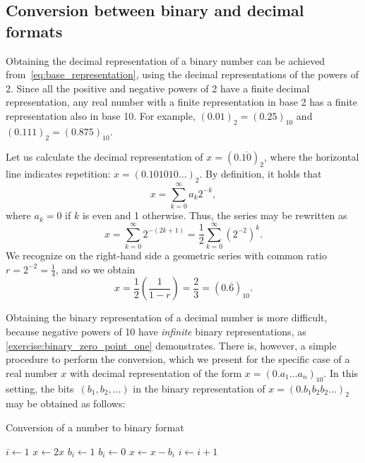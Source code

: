 \subsection{Conversion between binary and decimal formats}%
Obtaining the decimal representation of a binary number can be achieved from~\eqref{eq:base_representation},
using the decimal representations of the powers of 2.
Since all the positive and negative powers of 2 have a finite decimal representation,
any real number with a finite representation in base 2 has a finite representation also in base 10.
For example, $(0.01)_2 = (0.25)_{10}$ and $(0.111)_2 = (0.875)_{10}$.
\begin{example}
    \label{example:converting_binary_to_decimal}
    Let us calculate the decimal representation of $x = (0.\overline{10})_2$,
    where the horizontal line indicates repetition: $x = (0.101010\dots)_2$.
    By definition, it holds that
    \[
        x = \sum_{k=0}^{\infty} a_k 2^{-k},
    \]
    where $a_k = 0$ if $k$ is even and 1 otherwise.
    Thus, the series may be rewritten as
    \[
        x = \sum_{k=0}^{\infty} 2^{-(2k+1)} = \frac{1}{2} \sum_{k=0}^{\infty} (2^{-2})^k.
    \]
    We recognize on the right-hand side a geometric series with common ratio $r = 2^{-2} = \frac{1}{4}$,
    and so we obtain
    \[
        x = \frac{1}{2} \left( \frac{1}{1-r} \right) = \frac{2}{3} = (0.\overline 6)_{10}.
    \]
\end{example}

Obtaining the binary representation of a decimal number is more difficult,
because negative powers of 10 have \emph{infinite} binary representations,
as \cref{exercise:binary_zero_point_one} demonstrates.
There is, however, a simple procedure to perform the conversion,
which we present for the specific case of a real number $x$ with decimal representation of the form $x = (0.a_1\dots a_n)_{10}$.
In this setting,
the bits~$(b_1, b_2, \dots)$ in the binary representation of $x = (0.b_1b_2b_2 \dots)_2$ may be obtained as follows:
\begin{algorithm}
\caption{Conversion of a number to binary format}%
\label{algo:conversion_to_binary}%
\begin{algorithmic}[1]
\State $i \gets 1$
    \State $x \gets 2x$%
    \label{line:after_while}
        \State $b_i \gets 1$
    \Else
        \State $b_i \gets 0$
    \EndIf
    \State $x \gets x - b_i$
    \State $i \gets i+1$
\EndWhile
\end{algorithmic}
\end{algorithm}

